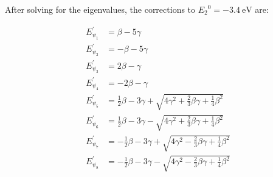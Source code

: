\documentclass[12pt, titlepage]{article}
\begin{document}
After solving for the eigenvalues, the corrections to ${E_2}^0 = -\SI{3.4}{\eV}$ are:

\begin{subequations}
\begin{align}
	E_{\psi_{1}}^\prime &= \beta-5\gamma \\[4pt]
	E_{\psi_{2}}^\prime &= -\beta-5\gamma \\[4pt]
	E_{\psi_{3}}^\prime &= 2\beta-\gamma \\[4pt]
	E_{\psi_{4}}^\prime &= -2\beta - \gamma \\[4pt]
	E_{\psi_{5}}^\prime &= \frac{1}{2}\beta - 3\gamma +\sqrt{4\gamma^2 + \frac{2}{3}\beta\gamma + \frac{1}{4}\beta^2}\\[4pt]
	E_{\psi_{6}}^\prime &= \frac{1}{2}\beta - 3\gamma - \sqrt{4\gamma^2 + \frac{2}{3}\beta\gamma + \frac{1}{4}\beta^2}\\[4pt]
	E_{\psi_{7}}^\prime &= -\frac{1}{2}\beta - 3\gamma + \sqrt{4\gamma^2 - \frac{2}{3}\beta\gamma + \frac{1}{4}\beta^2}\\[4pt]
	E_{\psi_{8}}^\prime &= -\frac{1}{2}\beta - 3\gamma - \sqrt{4\gamma^2 - \frac{2}{3}\beta\gamma + \frac{1}{4}\beta^2}
\end{align}
\end{subequations}
\end{document}
